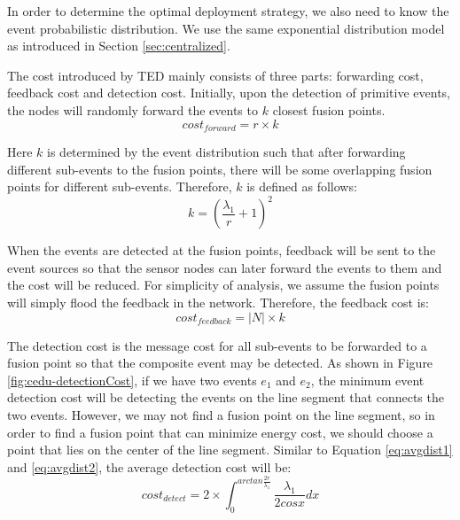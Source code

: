In order to determine the optimal deployment strategy, we also need to know the event probabilistic distribution. We use the same exponential distribution model as introduced in Section \ref{sec:centralized}. %

The cost introduced by TED mainly consists of three parts: forwarding cost, feedback cost and detection cost. Initially, upon the detection of primitive events, the nodes will randomly forward the events to \(k\) closest fusion points. 
\begin{displaymath}
cost_{forward}=r\times k
\end{displaymath}

Here \(k\) is determined by the event distribution such that after forwarding different sub-events to the fusion points, there will be some overlapping fusion points for different sub-events. Therefore, \(k\) is defined as follows:
\begin{equation}
k=(\frac{{\lambda}_1}{r}+1)^2\label{eq:forwardNum}
\end{equation}

When the events are detected at the fusion points, feedback will be sent to the event sources so that the sensor nodes can later forward the events to them and the cost will be reduced. For simplicity of analysis, we assume the fusion points will simply flood the feedback in the network. Therefore, the feedback cost is:
\begin{displaymath}
cost_{feedback}=|N|\times k
\end{displaymath}

The detection cost is the message cost for all sub-events to be forwarded to a fusion point so that the composite event may be detected. As shown in Figure \ref{fig:cedu-detectionCost}, if we have two events \(e_1\) and \(e_2\), the minimum event detection cost will be detecting the events on the line segment that connects the two events. However, we may not find a fusion point on the line segment, so in order to find a fusion point that can minimize energy cost, we should choose a point that lies on the center of the line segment. Similar to Equation \ref{eq:avgdist1} and \ref{eq:avgdist2}, the average detection cost will be:
\begin{displaymath}
cost_{detect}=2\times \int_0^{arctan\frac{2r}{{\lambda}_1}}\frac{{\lambda}_1}{2cosx}dx
\end{displaymath}

